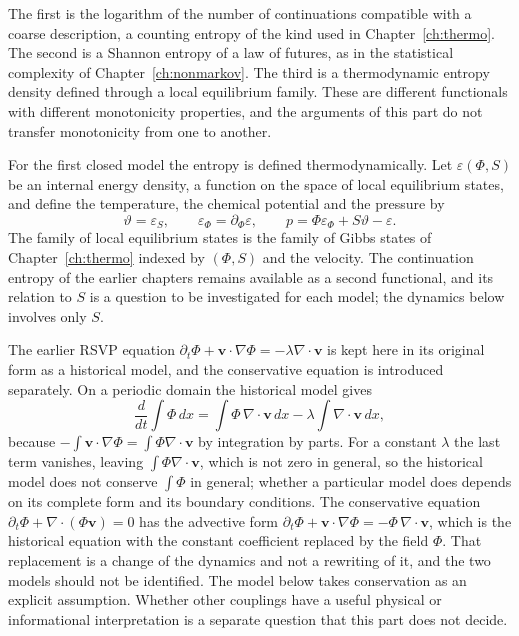 \documentclass[11pt,oneside]{book}
\theoremstyle{definition}
\theoremstyle{remark}
\begin{document}
The first is the logarithm of the number of continuations compatible with a coarse description, a counting entropy of the kind used in Chapter~\ref{ch:thermo}. The second is a Shannon entropy of a law of futures, as in the statistical complexity of Chapter~\ref{ch:nonmarkov}. The third is a thermodynamic entropy density defined through a local equilibrium family. These are different functionals with different monotonicity properties, and the arguments of this part do not transfer monotonicity from one to another.

For the first closed model the entropy is defined thermodynamically. Let $\varepsilon(\Phi,S)$ be an internal energy density, a function on the space of local equilibrium states, and define the temperature, the chemical potential and the pressure by
\[
\vartheta=\varepsilon_S,\qquad \varepsilon_\Phi=\partial_\Phi\varepsilon,\qquad p=\Phi\varepsilon_\Phi+S\vartheta-\varepsilon .
\]
The family of local equilibrium states is the family of Gibbs states of Chapter~\ref{ch:thermo} indexed by $(\Phi,S)$ and the velocity. The continuation entropy of the earlier chapters remains available as a second functional, and its relation to $S$ is a question to be investigated for each model; the dynamics below involves only $S$.

The earlier RSVP equation $\partial_t\Phi+\mathbf v\cdot\nabla\Phi=-\lambda\nabla\cdot\mathbf v$ \cite{flyxion2025rsvp} is kept here in its original form as a historical model, and the conservative equation is introduced separately. On a periodic domain the historical model gives
\[
\frac{d}{dt}\int\Phi\,dx=\int\Phi\,\nabla\!\cdot\mathbf v\,dx-\lambda\int\nabla\!\cdot\mathbf v\,dx ,
\]
because $-\int\mathbf v\cdot\nabla\Phi=\int\Phi\nabla\cdot\mathbf v$ by integration by parts. For a constant $\lambda$ the last term vanishes, leaving $\int\Phi\nabla\cdot\mathbf v$, which is not zero in general, so the historical model does not conserve $\int\Phi$ in general; whether a particular model does depends on its complete form and its boundary conditions. The conservative equation $\partial_t\Phi+\nabla\cdot(\Phi\mathbf v)=0$ has the advective form $\partial_t\Phi+\mathbf v\cdot\nabla\Phi=-\Phi\,\nabla\cdot\mathbf v$, which is the historical equation with the constant coefficient replaced by the field $\Phi$. That replacement is a change of the dynamics and not a rewriting of it, and the two models should not be identified. The model below takes conservation as an explicit assumption. Whether other couplings have a useful physical or informational interpretation is a separate question that this part does not decide.
\end{document}
